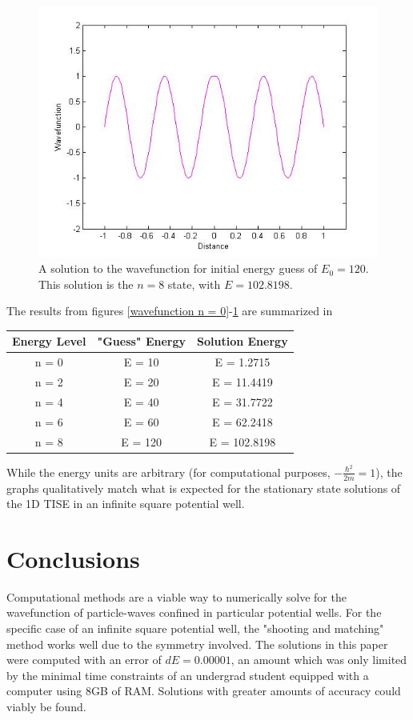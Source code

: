 \documentclass[12pt]{article}                  %
\begin{document}
\begin{figure}[H]
\centering
\includegraphics[scale=0.45]{aogle_final_n_8.jpg}
\caption{A solution to the wavefunction for initial energy guess of $E_{0} = 120$. This solution is the $n = 8$ state, with $E = 102.8198$.}
\label{wavefunction n = 8}
\end{figure}

The results from figures \ref{wavefunction n = 0}-\ref{wavefunction n = 8} are summarized in 

\begin{center}
\begin{tabular}{ |c|c|c| }
 \hline
 Energy Level & "Guess" Energy & Solution Energy \\ 
 \hline
 \hline
 n = 0 & E = 10 & E = 1.2715 \\ 
 \hline 
 n = 2 & E = 20 & E = 11.4419 \\ 
 \hline  
 n = 4 & E = 40 & E = 31.7722 \\ 
 \hline
 n = 6 & E = 60 & E = 62.2418 \\  
 \hline
 n = 8 & E = 120 & E = 102.8198 \\ 
 \hline
\end{tabular}
\end{center}

While the energy units are arbitrary (for computational purposes, $-\frac{\hbar^2}{2m} = 1$), the graphs qualitatively match what is expected for the stationary state solutions of the 1D TISE in an infinite square potential well. 


\section{Conclusions}
	Computational methods are a viable way to numerically solve for the wavefunction of particle-waves confined in particular potential wells. For the specific case of an infinite square potential well, the "shooting and matching" method works well due to the symmetry involved. The solutions in this paper were computed with an error of $dE = 0.00001$, an amount which was only limited by the minimal time constraints of an undergrad student equipped with a computer using 8GB of RAM. Solutions with greater amounts of accuracy could viably be found. 
	
\end{document}
